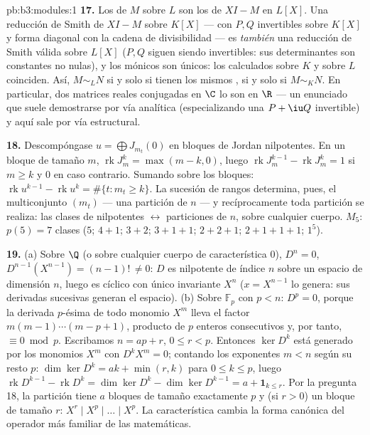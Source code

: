 \begin{solution}{pb:b3:modules:1}
\textbf{17.} Los  de $M$ sobre $L$ son los
 de $XI - M$ en
$L[X]$. Una reducción de Smith de $XI - M$ sobre $K[X]$ --- con $P, Q$
invertibles sobre $K[X]$ y forma diagonal con la cadena de divisibilidad
--- es \emph{también} una reducción de Smith válida sobre $L[X]$ ($P, Q$
siguen siendo invertibles: sus determinantes son constantes no nulas), y
los  mónicos son
únicos: los 
calculados sobre $K$ y sobre $L$ coinciden. Así, $M \sim_L N$ si y solo
si tienen los mismos , si y solo si $M \sim_K N$. En particular, dos matrices
reales conjugadas en $\C$ lo son en $\R$ --- un enunciado que suele
demostrarse por vía analítica (especializando una $P + \iu
Q$ invertible) y aquí sale por vía estructural.

\textbf{18.} Descompóngase $u = \bigoplus J_{m_t}(0)$ en bloques de
Jordan nilpotentes. En un bloque de tamaño $m$,
$\operatorname{rk}J_m^k = \max(m - k, 0)$, luego
$\operatorname{rk}J_m^{k-1} - \operatorname{rk}J_m^k = 1$ si $m
\geq k$ y $0$ en caso contrario. Sumando sobre los bloques:
$\operatorname{rk}u^{k-1} - \operatorname{rk}u^k =
\#\{t : m_t \geq k\}$. La sucesión de rangos determina, pues, el
multiconjunto $(m_t)$ --- una partición de $n$ --- y recíprocamente toda
partición se realiza: las clases de nilpotentes $\leftrightarrow$
particiones de $n$, sobre cualquier cuerpo. $M_5$: $p(5) = 7$ clases
($5$; $4{+}1$; $3{+}2$; $3{+}1{+}1$; $2{+}2{+}1$;
$2{+}1{+}1{+}1$; $1^5$).

\textbf{19.} (a) Sobre $\Q$ (o sobre cualquier cuerpo de característica
$0$), $D^n = 0$, $D^{n-1}(X^{n-1}) = (n-1)!\, \neq 0$: $D$ es nilpotente
de índice $n$ sobre un espacio de dimensión $n$, luego es cíclico con
único invariante $X^n$ ($x = X^{n-1}$ lo genera: sus derivadas sucesivas
generan el espacio). (b) Sobre $\mathbb F_p$ con $p
< n$: $D^p = 0$, porque la derivada $p$-ésima de todo monomio $X^m$
lleva el factor $m(m-1)\cdots(m-p+1)$, producto de $p$ enteros
consecutivos y, por tanto, $\equiv 0 \bmod p$. Escribamos $n = ap + r$,
$0 \leq r < p$. Entonces $\ker D^k$ está generado por los monomios $X^m$
con $D^kX^m = 0$; contando los exponentes $m < n$ según su resto 
$p$: $\dim\ker D^k = ak + \min(r,
k)$ para $0 \leq k \leq p$, luego $\operatorname{rk}D^{k-1} -
\operatorname{rk}D^k = \dim\ker D^k - \dim\ker D^{k-1} = a +
\mathbf 1_{k \leq r}$. Por la pregunta 18, la partición tiene $a$
bloques de tamaño exactamente $p$ y (si $r > 0$) un bloque de tamaño
$r$: 
$X^r \mid X^p \mid \dots \mid X^p$. La característica cambia la forma
canónica del operador más familiar de las matemáticas.


\end{solution}
